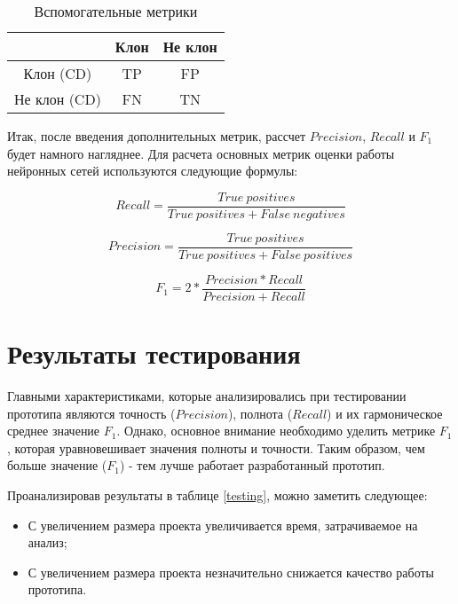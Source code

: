 \begin{table}[H]
\centering
\captionsetup{skip=5pt}
\caption{Вспомогательные метрики}
\label{truepos}
\begin{tabular}{c|c|c|}
\cline{2-3}
                                   & Клон & Не клон \\ \hline
\multicolumn{1}{|c|}{Клон (CD)}    & TP   & FP      \\ \hline
\multicolumn{1}{|c|}{Не клон (CD)} & FN   & TN      \\ \hline
\end{tabular}
\end{table}

Итак, после введения дополнительных метрик, рассчет \(Precision\), \(Recall\) и \(F_1\) будет намного нагляднее. Для расчета основных метрик оценки работы нейронных сетей используются следующие формулы:

\begin{equation}
\label{eq:recall}
Recall = \frac{True\ positives}{True\ positives + False\ negatives}
\end{equation}

\begin{equation}
\label{eq:precision}
Precision = \frac{True\ positives}{True\ positives + False\ positives}
\end{equation}

\begin{equation}
\label{eq:f1}
F_1 = 2*\frac{Precision * Recall}{Precision + Recall}
\end{equation}

\section{Результаты тестирования}

Главными характеристиками, которые анализировались при тестировании прототипа являются точность (\(Precision\)), полнота (\(Recall\)) и их гармоническое среднее значение \(F_1\). Однако, основное внимание необходимо уделить метрике \(F_1\), которая уравновешивает значения полноты и точности. Таким образом, чем больше значение (\(F_1\)) - тем лучше работает разработанный прототип.

Проанализировав результаты в таблице \ref{testing}, можно заметить следующее:
\begin{itemize}
\setlength\itemsep{0mm}
\item С увеличением размера проекта увеличивается время, затрачиваемое на анализ;
\item С увеличением размера проекта незначительно снижается качество работы прототипа.
\end{itemize}

